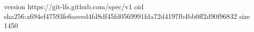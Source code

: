 version https://git-lfs.github.com/spec/v1
oid sha256:a694ef47593fe6aeced4fd8df45fd0569991fda72d4197fb4bb0ff2d90f96832
size 1450
